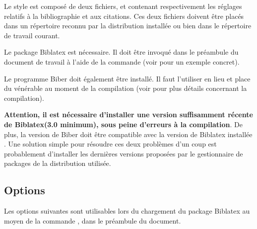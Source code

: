 \documentclass{ltxdockit}
\newcommand*{\biber}{Biber\xspace}
\newcommand*{\biblatex}{Biblatex\xspace}
\newcommand*{\bibstylename}{droit-fr\xspace}
\begin{document}
Le style \sty{\bibstylename} est composé de deux fichiers,  et  contenant respectivement les réglages relatifs à la bibliographie et aux citations. Ces deux fichiers doivent être placés dans un répertoire reconnu par la distribution \latex installée ou bien dans le répertoire de travail courant.

Le package \biblatex est nécessaire. Il doit être invoqué dans le préambule du document de travail à l'aide de la commande  (voir  pour un exemple concret).

Le programme \biber doit également être installé. Il faut l'utiliser en lieu et place du vénérable \bibtex au moment de la compilation (voir  pour plus détails concernant la compilation).

\textbf{Attention, il est nécessaire d'installer une version suffisamment récente de \biblatex (3.0 minimum), sous peine d'erreurs à la compilation}. De plus, la version de \biber doit être compatible avec la version de \biblatex installée . Une solution simple pour résoudre ces deux problèmes d'un coup est probablement d'installer les dernières versions proposées par le gestionnaire de packages de la distribution \latex utilisée.

\subsection{Options}
\label{biboptions}

Les options suivantes sont utilisables lors du chargement du package \biblatex au moyen de la commande , dans le préambule du document.
\end{document}
